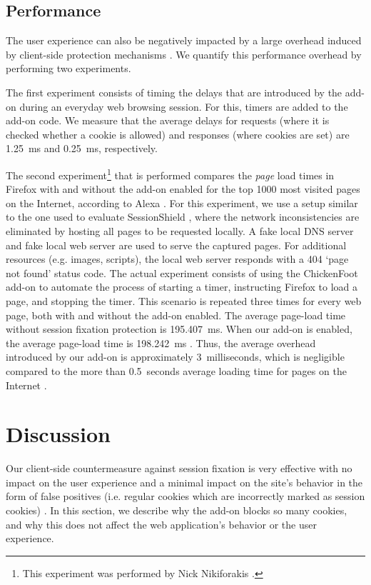\subsection{Performance}\label{performance}

The user experience can also be negatively impacted by a large overhead induced by client-side protection mechanisms \cite{Bonne2011}. We quantify this performance overhead by performing two experiments.

The first experiment consists of timing the delays that are introduced by the add-on during an everyday web browsing session. For this, timers are added to the add-on code. We measure that the average delays for requests (where it is checked whether a cookie is allowed) and responses (where cookies are set) are 1.25\ ms and 0.25\ ms, respectively.

The second experiment\footnote{This experiment was performed by Nick Nikiforakis \cite{Bonne2011}.} that is performed compares the \emph{page} load times in Firefox with and without the add-on enabled for the top 1000 most visited pages on the Internet, according to Alexa \cite{Alexa1000}. For this experiment, we use a setup similar to the one used to evaluate SessionShield \cite{Nikiforakis2010}, where the network inconsistencies are eliminated by hosting all pages to be requested locally. A fake local DNS server and fake local web server are used to serve the captured pages. For additional resources (e.g. images, scripts), the local web server responds with a 404 `page not found' status code. The actual experiment consists of using the ChickenFoot add-on \cite{ChickenFoot} to automate the process of starting a timer, instructing Firefox to load a page, and stopping the timer. This scenario is repeated three times for every web page, both with and without the add-on enabled. The average page-load time without session fixation protection is 195.407\ ms. When our add-on is enabled, the average page-load time is 198.242\ ms \cite{Bonne2011}. Thus, the average overhead introduced by our add-on is approximately 3\ milliseconds, which is negligible compared to the more than 0.5\ seconds average loading time for pages on the Internet \cite{Webmetrics}.

\section{Discussion}\label{discussion}

Our client-side countermeasure against session fixation is very effective with no impact on the user experience and a minimal impact on the site's behavior in the form of false positives (i.e. regular cookies which are incorrectly marked as session cookies) \cite{Bonne2011}. In this section, we describe why the add-on blocks so many cookies, and why this does not affect the web application's behavior or the user experience.


